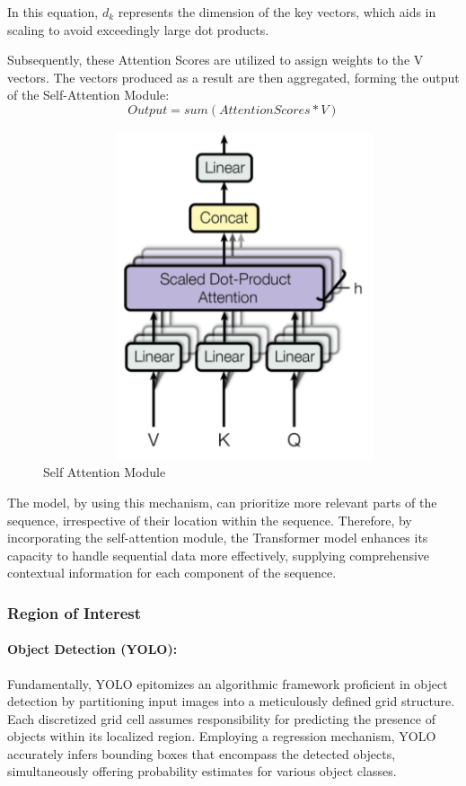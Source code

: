 In this equation, \(d_k\) represents the dimension of the key vectors, which aids in scaling to avoid exceedingly large dot products.

Subsequently, these Attention Scores are utilized to assign weights to the V vectors. The vectors produced as a result are then aggregated, forming the output of the Self-Attention Module:
\begin{equation}
    Output = sum(AttentionScores * V)
\end{equation}

\begin{figure}
    \centering
    \includegraphics[scale=.5]{figures/self_attention.png}
    \caption{Self Attention Module \cite{woo2018cbam}}
    \label{fig:my_label}
\end{figure}

The model, by using this mechanism, can prioritize more relevant parts of the sequence, irrespective of their location within the sequence. Therefore, by incorporating the self-attention module, the Transformer model enhances its capacity to handle sequential data more effectively, supplying comprehensive contextual information for each component of the sequence.

\subsubsection{Region of Interest}
\paragraph{Object Detection (YOLO):}
Fundamentally, YOLO\cite{redmon2016you} epitomizes an algorithmic framework proficient in object detection by partitioning input images into a meticulously defined grid structure. Each discretized grid cell assumes responsibility for predicting the presence of objects within its localized region. Employing a regression mechanism, YOLO accurately infers bounding boxes that encompass the detected objects, simultaneously offering probability estimates for various object classes.

